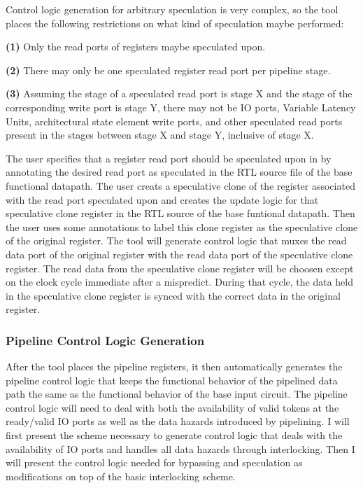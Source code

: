 Control logic generation for arbitrary speculation is very complex, so the tool places the following restrictions on what kind of speculation maybe performed:

{\bf (1)} Only the read ports of registers maybe speculated upon.

{\bf (2)} There may only be one speculated register read port per pipeline stage.

{\bf (3)} Assuming the stage of a speculated read port is stage X and the stage of the corresponding write port is stage Y, there may not be IO ports, Variable Latency Units, architectural state element write ports, and other speculated read ports present in the stages between stage X and stage Y, inclusive of stage X.

The user specifies that a register read port should be speculated upon in by annotating the desired read port as speculated in the RTL source file of the base functional datapath. The user creats a speculative clone of the register associated with the read port speculated upon and creates the update logic for that speculative clone register in the RTL source of the base funtional datapath. Then the user uses some annotations to label this clone register as the speculative clone of the original register. The tool will generate control logic that muxes the read data port of the original register with the read data port of the speculative clone register. The read data from the speculative clone register will be choosen except on the clock cycle immediate after a mispredict. During that cycle, the data held in the speculative clone register is synced with the correct data in the original register.

\subsubsection{Pipeline Control Logic Generation}
After the tool places the pipeline registers, it then automatically generates the pipeline control logic that keeps the functional behavior of the pipelined data path the same as the functional behavior of the base input circuit. The pipeline control logic will need to deal with both the availability of valid tokens at the ready/valid IO ports as well as the data hazards introduced by pipelining. I will first present the scheme necessary to generate control logic that deals with the availability of IO ports and handles all data hazards through interlocking. Then I will present the control logic needed for bypassing and speculation as modifications on top of the basic interlocking scheme.

